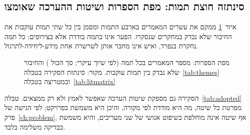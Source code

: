 \subsection{סינתזה חוצת תמות: מפת הספרות ושיטות ההערכה שאומצו}\label{sec:crossmap}
איור~\ref{fig:litmap} ממקם את עשרים המאמרים בארבע התמות ומסמן בין כל שתי תמות עוקבות את החיבור שלא נבדק במחקרים שנסקרו. הפער אינו בתמה
בודדת אלא בצירופים: כל תמה נחקרת בנפרד, ואיש אינו מחבר אותן לשרשרת אחת מידע-ליחידה-לתרגול.
\begin{figure}[!htbp]
\centering
{}
\caption[מפת הספרות: ארבע תמות והחיבורים שלא נבדקו]{מפת הספרות: מספר המאמרים בכל תמה (לפי שיוך עיקרי; סך הכול ) והחיבור שלא נבדק בין תמות עוקבות. מקור: סינתזת הסקירה בטבלה~\ref{tab:themes} ובמטריצה בטבלה~\ref{tab:litmatrix}}\label{fig:litmap}
\end{figure}
הסקירה גם מספקת שיטות הערכה שאפשר לאמץ ולא רק ממצאים. טבלה~\ref{tab:adopted} מפרטת כל שיטה, מה היא מודדת לפי מקורה, והיכן היא משמשת בפרויקט; לפי
הגישה של פרק~\ref{ch:problem}, אף שיטה אינה מוחלפת בשיפוט אנושי של שני מעריכים, והיא משמשת כבדיקה משלימה בלבד.
